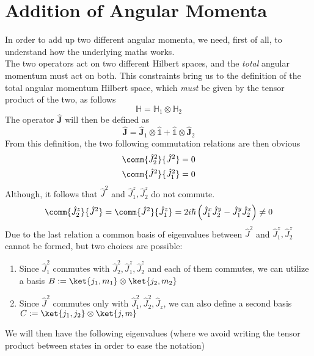 \documentclass[a4paper, 11pt]{book}
\renewcommand{\vec}[1]{\mathbf{#1}}
\newcommand{\1}{\opr{\mathds{1}}}
\newcommand{\opr}[1]{\hat{#1}}
\newcommand{\vecopr}[1]{\opr{\vec{#1}}}
\newcommand{\hilbert}{\mathbb{H}}
\theoremstyle{plain}
\begin{document}
	\section{Addition of Angular Momenta}
	In order to add up two different angular momenta, we need, first of all, to understand how the underlying maths works.\\
	The two operators act on two different Hilbert spaces, and the \textit{total} angular momentum must act on both. This constraints bring us to the definition of the total angular momentum Hilbert space, which \emph{must} be given by the tensor product of the two, as follows
	\begin{equation}
		\hilbert=\hilbert_1\otimes\hilbert_2
		\label{eq:totalangmomspace}
	\end{equation}
	The operator $\vecopr{J}$ will then be defined as
	\begin{equation}
		\vecopr{J}=\vecopr{J}_1\otimes\1+\1\otimes\vecopr{J}_2
		\label{eq:jdef}
	\end{equation}
	From this definition, the two following commutation relations are then obvious
	\begin{equation}
		\begin{aligned}
			\comm{\opr{J}_2^2}{\opr{J}^2}&=0\\
			\comm{\opr{J}^2}{\opr{J}_1^2}&=0
		\end{aligned}
		\label{eq:commreljsjl}
	\end{equation}
	Although, it follows that $\opr{J}^2$ and $\opr{J}_1^z,\opr{J}_2^z$ do not commute.
	\begin{equation}
		\comm{\opr{J}_2^z}{\opr{J}^2}=\comm{\opr{J}^2}{\opr{J}_1^z}=2i\hbar\left( \opr{J}_1^x\opr{J}_2^y-\opr{J}_1^y\opr{J}_2^x \right)\ne0
		\label{eq:commrelszj2lzj2}
	\end{equation}
	Due to the last relation a common basis of eigenvalues between $\opr{J}^2$ and $\opr{J}_1^z,\opr{J}_2^z$ cannot be formed, but two choices are possible:\\
	\begin{enumerate}
	\item Since $\opr{J}_1^2$ commutes with $\opr{J}_2^2,\opr{J}_1^z,\opr{J}_2^z$ and each of them commutes, we can utilize a basis $B:=\ket{j_1,m_1}\otimes\ket{j_2,m_2}$
	\item Since $\opr{J}^2$ commutes only with $\opr{J}_1^2,\opr{J}_2^2,\opr{J}_z$, we can also define a second basis $C:=\ket{j_1,j_2}\otimes\ket{j,m}$
	\end{enumerate}
	We will then have the following eigenvalues (where we avoid writing the tensor product between states in order to ease the notation)
\end{document}
